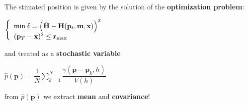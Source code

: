 {\begin{columns}[c]
\begin{block}{}
		The stimated position is given by the solution of the \textbf{optimization problem}:
		\vspace{0.5cm}
		
		$\left\{\begin{array}{l}\mathrm{min}\, \delta = \left( \hat{\mathbf{H}} - \mathbf{H}(\mathbf{p}_t, \mathbf{m}, \mathbf{x}) \right)^2 \\ (\mathbf{p}_T-\mathbf{x})^2 \leq \mathbf{r}_{\mathrm{max}}\end{array}\right.$
		\vspace{0.5cm}
		
		and treated as a \textbf{stochastic variable}
		\vspace{1cm}
		
		$\hat{p}(\mathbf{p}) = \dfrac{1}{N}\sum\limits_{k=1}^{N} \dfrac{\gamma(\mathbf{p}-\mathbf{p}_k,h)}{V(h)}$

		\vspace{1cm}
		from $\hat{p}(\mathbf{p})$ we extract \textbf{mean} and \textbf{covariance}!
		\vspace{1.175cm}
	\end{block}
	\end{columns}
}